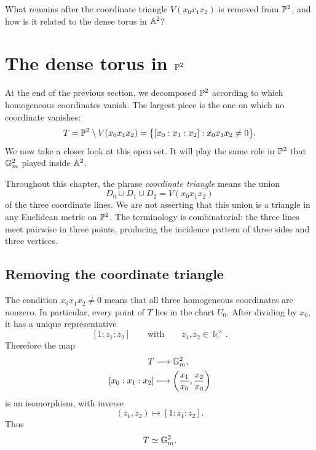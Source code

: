 \begin{guidingquestion}
What remains after the coordinate triangle
\(V(x_0x_1x_2)\) is removed from \(\mathbb{P}^2\), and how is it related to
the dense torus in \(\mathbb{A}^2\)?
\end{guidingquestion}


\section{The dense torus in
\texorpdfstring{\(\mathbb{P}^2\)}{P2}}
\label{sec:p2-dense-torus}

At the end of the previous section, we decomposed \(\mathbb{P}^2\) according
to which homogeneous coordinates vanish. The largest piece is the one
on which no coordinate vanishes:
\[
T
=
\mathbb{P}^2\setminus V(x_0x_1x_2)
=
\bigl\{[x_0:x_1:x_2]:x_0x_1x_2\neq0\bigr\}.
\]
We now take a closer look at this open set. It will play the same role
in \(\mathbb{P}^2\) that \(\mathbb{G}_{m}^2\) played inside \(\mathbb{A}^2\).

Throughout this chapter, the phrase \emph{coordinate triangle} means
the union
\[
D_0\cup D_1\cup D_2
=
V(x_0x_1x_2)
\]
of the three coordinate lines. We are not asserting that this union is
a triangle in any Euclidean metric on \(\mathbb{P}^2\). The terminology is
combinatorial: the three lines meet pairwise in three points, producing
the incidence pattern of three sides and three vertices.

\subsection{Removing the coordinate triangle}

The condition \(x_0x_1x_2\neq0\) means that all three homogeneous
coordinates are nonzero. In particular, every point of \(T\) lies in
the chart \(U_0\). After dividing by \(x_0\), it has a unique
representative
\[
[1:z_1:z_2]
\qquad\text{with}\qquad
z_1,z_2\in\Bbbk^\times.
\]
Therefore the map
\[
\begin{aligned}
T&\longrightarrow\mathbb{G}_{m}^2,\\
[x_0:x_1:x_2]
&\longmapsto
\left(\frac{x_1}{x_0},\frac{x_2}{x_0}\right)
\end{aligned}
\]
is an isomorphism, with inverse
\[
(z_1,z_2)\longmapsto[1:z_1:z_2].
\]
Thus
\[
T\simeq\mathbb{G}_{m}^2.
\]

